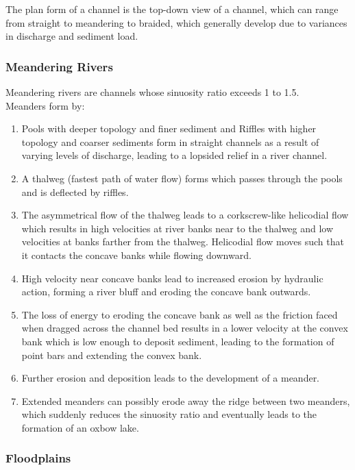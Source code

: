 \documentclass[../../main]{subfiles}
\begin{document}
	The plan form of a channel is the top-down view of a channel, which can range from straight to meandering to braided, which generally develop due to variances in discharge and sediment load.

\subsubsection{Meandering Rivers}

	Meandering rivers are channels whose sinuosity ratio exceeds 1 to 1.5. \\

	Meanders form by:

	\begin{enumerate}
		\item Pools with deeper topology and finer sediment and Riffles with higher topology and coarser sediments form in straight channels as a result of varying levels of discharge, leading to a lopsided relief in a river channel.
		\item A thalweg (fastest path of water flow) forms which passes through the pools and is deflected by riffles.
		\item The asymmetrical flow of the thalweg leads to a corkscrew-like helicodial flow which results in high velocities at river banks near to the thalweg and low velocities at banks farther from the thalweg. Helicodial flow moves such that it contacts the concave banks while flowing downward.
		\item High velocity near concave banks lead to increased erosion by hydraulic action, forming a river bluff and eroding the concave bank outwards.
		\item The loss of energy to eroding the concave bank as well as the friction faced when dragged across the channel bed results in a lower velocity at the convex bank which is low enough to deposit sediment, leading to the formation of point bars and extending the convex bank.
		\item Further erosion and deposition leads to the development of a meander.
		\item Extended meanders can possibly erode away the ridge between two meanders, which suddenly reduces the sinuosity ratio and eventually leads to the formation of an oxbow lake.
	\end{enumerate}

\subsubsection{Floodplains}
\end{document}
